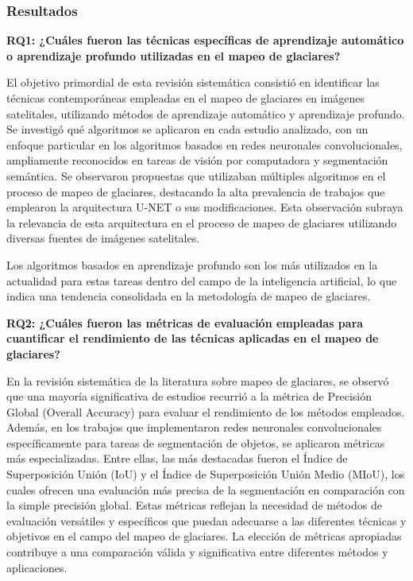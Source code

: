 \subsubsection{Resultados} 

\textbf{RQ1: ¿Cuáles fueron las técnicas específicas de aprendizaje automático o aprendizaje profundo utilizadas en el mapeo de glaciares?}

El objetivo primordial de esta revisión sistemática consistió en identificar las técnicas contemporáneas empleadas en el mapeo de glaciares en imágenes satelitales, utilizando métodos de aprendizaje automático y aprendizaje profundo.
Se investigó qué algoritmos se aplicaron en cada estudio analizado, con un enfoque particular en los algoritmos basados en redes neuronales convolucionales, ampliamente reconocidos en tareas de visión por computadora y segmentación semántica.
Se observaron propuestas que utilizaban múltiples algoritmos en el proceso de mapeo de glaciares, destacando la alta prevalencia de trabajos que emplearon la arquitectura U-NET o sus modificaciones. Esta observación subraya la relevancia de esta arquitectura en el proceso de mapeo de glaciares utilizando diversas fuentes de imágenes satelitales.





Los algoritmos basados en aprendizaje profundo son los más utilizados en la actualidad para estas tareas dentro del campo de la inteligencia artificial, lo que indica una tendencia consolidada en la metodología de mapeo de glaciares.

\textbf{RQ2: ¿Cuáles fueron las métricas de evaluación empleadas para cuantificar el rendimiento de las técnicas aplicadas en el mapeo de glaciares?}

En la revisión sistemática de la literatura sobre mapeo de glaciares, se observó que una mayoría significativa de estudios recurrió a la métrica de Precisión Global (Overall Accuracy) para evaluar el rendimiento de los métodos empleados.
Además, en los trabajos que implementaron redes neuronales convolucionales específicamente para tareas de segmentación de objetos, se aplicaron métricas más especializadas. Entre ellas, las más destacadas fueron el Índice de Superposición Unión (IoU) y el Índice de Superposición Unión Medio (MIoU), los cuales ofrecen una evaluación más precisa de la segmentación en comparación con la simple precisión global.
Estas métricas reflejan la necesidad de métodos de evaluación versátiles y específicos que puedan adecuarse a las diferentes técnicas y objetivos en el campo del mapeo de glaciares. La elección de métricas apropiadas contribuye a una comparación válida y significativa entre diferentes métodos y aplicaciones.

